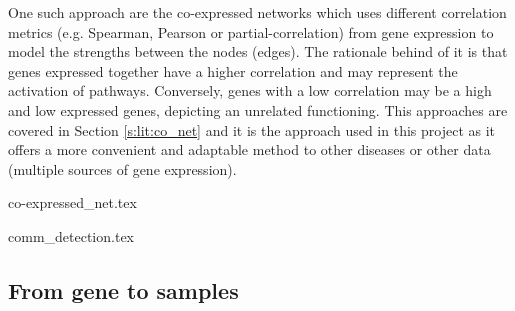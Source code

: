 One such approach are the co-expressed networks which uses different correlation metrics (e.g. Spearman, Pearson or partial-correlation) from gene expression to model the strengths between the nodes (edges). The rationale behind of it is that genes expressed together have a higher correlation and may represent the activation of pathways. Conversely, genes with a low correlation may be a high and low expressed genes, depicting an unrelated functioning. This approaches are covered in Section \ref{s:lit:co_net} and it is the approach used in this project as it offers a more convenient and adaptable method to other diseases or other data (multiple sources of gene expression).

{co-expressed_net.tex}

{comm_detection.tex}


\subsection{From gene to samples}


